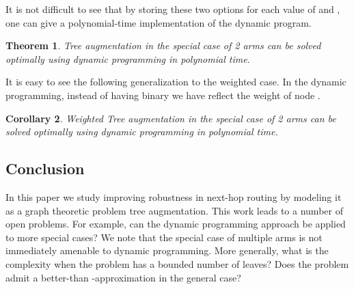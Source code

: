 \documentclass{article}
\newtheorem{theorem}{Theorem}
\newtheorem{cor}[theorem]{Corollary}
\begin{document}
It is not difficult to see that by storing these two options for
each value of  and , one can give a polynomial-time implementation
of the dynamic program.


\begin{theorem}
{\sc Tree augmentation} in the special case of 2 arms can be solved
optimally using dynamic programming in polynomial time.
\end{theorem}
It is easy to see the following generalization to the weighted case.
In the dynamic programming, instead of having binary  we have
 reflect the weight of node .  
\begin{cor}
{\sc Weighted Tree augmentation} in the special case of 2 arms can be
solved optimally using dynamic programming in polynomial time.
\end{cor}



\subsection*{Conclusion}
In this paper we study improving robustness in next-hop routing by
modeling it as a graph theoretic problem {\sc tree augmentation}.
This work leads to a number of open problems. For example, can the
dynamic programming approach be applied to more special cases?  We
note that the special case of multiple arms is not immediately
amenable to dynamic programming. More generally, what is the
complexity when the problem has a bounded number of leaves?  Does the
problem admit a better-than -approximation in the general case?



 

\end{document}
